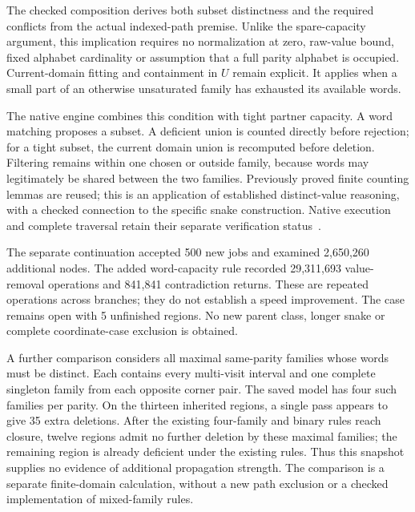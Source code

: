 \documentclass[11pt,a4paper]{article}
\theoremstyle{definition}
\theoremstyle{remark}
\begin{document}
The checked composition derives both subset distinctness and the required
conflicts from the actual indexed-path premise. Unlike the spare-capacity
argument, this implication requires no normalization at zero, raw-value
bound, fixed alphabet cardinality or assumption that a full parity
alphabet is occupied. Current-domain fitting and containment in $U$
remain explicit. It applies when a small part of an otherwise
unsaturated family has exhausted its available words.

The native engine combines this condition with tight partner capacity.
A word matching proposes a subset. A deficient union is counted
directly before rejection; for a tight subset, the current domain
union is recomputed before deletion. Filtering remains within one
chosen or outside family, because words may legitimately be shared
between the two families. Previously proved finite counting lemmas
are reused; this is an application of established distinct-value
reasoning, with a checked connection to the specific snake construction.
Native execution and complete traversal retain their separate
verification status~\cite{research215}.

The separate continuation accepted 500 new jobs and examined 2,650,260 additional nodes. The added word-capacity rule recorded 29,311,693 value-removal operations and 841,841 contradiction returns. These are repeated operations across branches; they do not establish a speed improvement.
The case remains open with 5 unfinished regions. No new parent class, longer snake or complete coordinate-case exclusion is obtained.

A further comparison considers all maximal same-parity families whose
words must be distinct. Each contains every multi-visit interval and
one complete singleton family from each opposite corner pair. The saved
model has four such families per parity. On the thirteen inherited
regions, a single pass appears to give 35 extra deletions. After the
existing four-family and binary rules reach closure, twelve regions
admit no further deletion by these maximal families; the remaining
region is already deficient under the existing rules. Thus this
snapshot supplies no evidence of additional propagation strength.
The comparison is a separate finite-domain calculation, without a
new path exclusion or a checked implementation of mixed-family rules.
\end{document}
